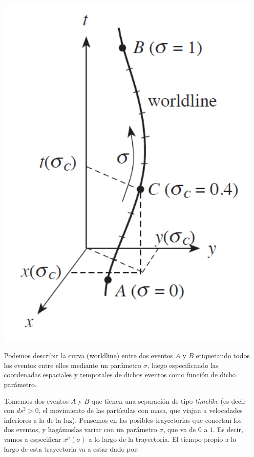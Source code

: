 \begin{marginfigure}
\captionsetup{type=figure}
    \centering
    \includegraphics[width=1.3\textwidth]{Im/geod.png}
    \caption{Podemos describir la curva (worldline) entre dos eventos $A$ y $B$ etiquetando todos los eventos entre ellos mediante un parámetro $\sigma$, luego especificando las coordenadas espaciales y temporales de dichos eventos como función de dicho parámetro.}
    \label{fig:sen}
\end{marginfigure}

Tomemos dos eventos $A$ y $B$ que tienen una separación de tipo \textit{timelike} (es decir con $ds^2>0$, el movimiento de las partículas con masa, que viajan a velocidades inferiores a la de la luz). Pensemos en las posibles trayectorias que conectan los dos eventos, y hagámoslas variar con un parámetro $\sigma$, que va de $0$ a $1$. Es decir, vamos a especificar $x^{\mu}(\sigma)$ a lo largo de la trayectoria. El tiempo propio a lo largo de esta trayectoria va a estar dado por:


